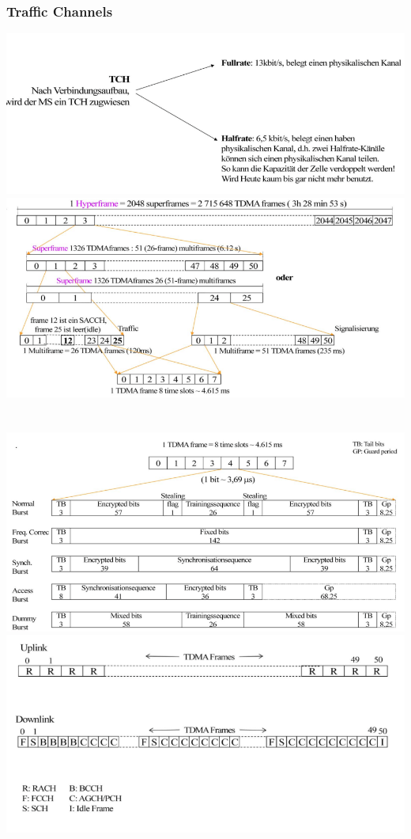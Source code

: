 \subsubsection{Traffic Channels}
\includegraphics[width = 0.5 \linewidth]{./Pics/GSMTCH}
\includegraphics[width = 0.5 \linewidth]{./Pics/GSMFRrameBurstStruktur} $\;$\\ \\
\includegraphics[width = 0.5 \linewidth]{./Pics/GSMBurstStruktur}
\includegraphics[width = 0.5 \linewidth]{./Pics/GSMMultiframe}
